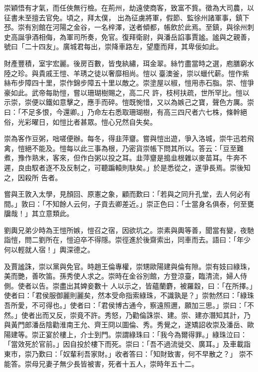 \begin{pinyinscope}
 崇穎悟有才氣，而任俠無行檢。在荊州，劫遠使商客，致富不貲。徵為大司農，以征書未至擅去官免。頃之，拜太僕，
 出為征虜將軍，假節、監徐州諸軍事，鎮下邳。崇有別館在河陽之金谷，一名梓澤，送者傾都，帳飲於此焉。至鎮，與徐州刺史高誕爭酒相侮，為軍司所奏，免官。復拜衛尉，與潘岳諂事賈謐。謐與之親善，號曰「二十四友」。廣城君每出，崇降車路左，望塵而拜，其卑佞如此。



 財產豐積，室宇宏麗。後房百數，皆曳紈繡，珥金翠。絲竹盡當時之選，庖膳窮水陸之珍。與貴戚王愷、羊琇之徒以奢靡相尚。愷以臺澳釜，崇以蠟代薪。愷作紫絲布步障四十里，崇作錦步障五十里以敵之。崇塗屋以椒，愷用赤石脂。崇、愷爭豪如此。武帝每助愷，嘗以珊瑚樹賜之，高二尺
 許，枝柯扶疏，世所罕比。愷以示崇，崇便以鐵如意擊之，應手而碎。愷既惋惜，又以為嫉己之寶，聲色方厲。崇曰：「不足多恨，今還卿。」乃命左右悉取珊瑚樹，有高三四尺者六七株，條幹絕俗，光彩曜日，如愷比者甚眾。愷心兄然自失矣。



 崇為客作豆粥，咄嗟便辦。每冬，得韭萍齏。嘗與愷出遊，爭入洛城，崇牛迅若飛禽，愷絕不能及。愷每以此三事為根，乃密貨崇帳下問其所以。答云：「豆至難煮，豫作熟末，客來，但作白粥以投之耳。韭萍齏是搗韭根雜以麥苗耳。牛奔不遲，良由馭者逐不及反制之，可聽蹁轅則駃矣。」於是悉從之，遂爭長焉。崇後知之，因殺所
 告者。



 嘗與王敦入太學，見顏回、原憲之象，顧而歎曰：「若與之同升孔堂，去人何必有間。」敦曰：「不知餘人云何，子貢去卿差近。」崇正色曰：「士當身名俱泰，何至甕牖哉！」其立意類此。



 劉輿兄弟少時為王愷所嫉，愷召之宿，因欲坑之。崇素與輿等善，聞當有變，夜馳詣愷，問二劉所在，愷迫卒不得隱。崇徑進於後齋索出，同車而去。語曰：「年少何以輕就人宿！」輿深德之。



 及賈謐誅，崇以黨與免官。時趙王倫專權，崇甥歐陽建與倫有隙。崇有妓曰綠珠，美而艷，善吹笛。孫秀使人求之。崇時在金谷別館，方登涼臺，臨清流，婦人侍側。使者以告。崇盡出其婢妾數十
 人以示之，皆蘊蘭麝，被羅縠，曰：「在所擇。」使者曰：「君侯服御麗則麗矣，然本受命指索綠珠，不識孰是？」崇勃然曰：「綠珠吾所愛，不可得也。」使者曰：「君侯博古通今，察遠照邇，願加三思。」崇曰：「不然。」使者出而又反，崇竟不許。秀怒，乃勸倫誅崇、建。崇、建亦潛知其計，乃與黃門郎潘岳陰勸淮南王允、齊王冏以圖倫、秀。秀覺之，遂矯詔收崇及潘岳、歐陽建等。崇正宴於樓上，介士到門。崇謂綠珠曰：「我今為爾得罪。」綠珠泣曰：「當效死於官前。」因自投於樓下而死。崇曰：「吾不過流徙交、廣耳。」及車載詣東市，崇乃歎曰：「奴輩利吾家財。」收者答曰：「知財致害，何不早散之？」
 崇不能答。崇母兄妻子無少長皆被害，死者十五人，崇時年五十二。




\end{pinyinscope}
